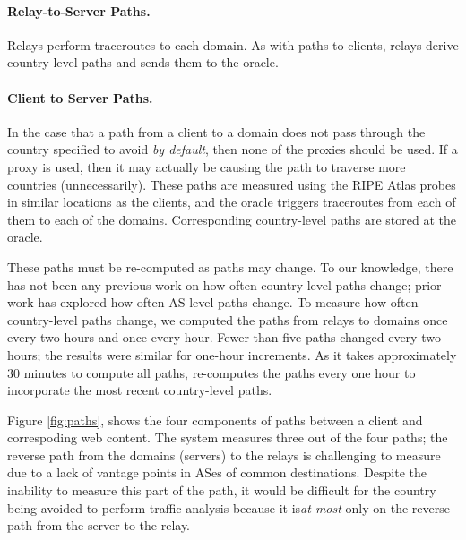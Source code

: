 \paragraph{Relay-to-Server Paths.} Relays perform 
traceroutes to each domain.  As with paths to clients,
relays derive country-level paths and sends them to the oracle.

\paragraph{Client to Server Paths.} In the case that a path from a client to a 
domain does not pass through the country specified to avoid {\it by default}, 
then none of the proxies should be used.  If a proxy is used, then it may 
actually be causing the path to traverse more countries (unnecessarily).  These 
paths are measured using the RIPE Atlas probes in similar locations as the 
clients, and the oracle triggers traceroutes from each of
them to each of the domains.  Corresponding country-level paths 
are stored at the oracle.  

These paths must be re-computed 
as paths may change.  To our knowledge, there has not been any previous work 
on how often country-level paths change; prior work has explored how often 
AS-level paths change.  To measure how often country-level paths change, we 
computed the paths from relays to domains once every two hours and once every 
hour.  Fewer than five paths changed every two hours; the 
results were similar for one-hour increments.  As it takes approximately 30 minutes to 
compute all paths, \system{} re-computes the paths every one hour to incorporate 
the most recent country-level paths.


Figure \ref{fig:paths}, shows the four components of paths between a
client and correspoding web content.  The system measures three 
out of the four paths; the reverse path from the domains (servers) to the relays 
is challenging to measure due to a lack of vantage points in ASes of
common destinations.  Despite the inability to measure this part of the
path, it would be difficult for the country being avoided to perform
traffic analysis because it is{\it at most} only on the reverse path 
from the server to the relay. 

